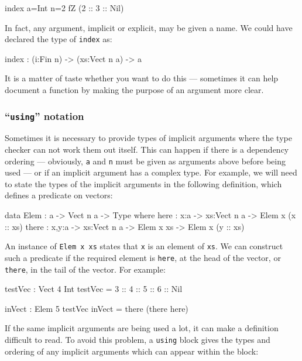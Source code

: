 \begin{code}
index {a=Int} {n=2} fZ (2 :: 3 :: Nil)
\end{code}

\noindent
In fact, any argument, implicit or explicit, may be given a name.
We could have declared the type of \texttt{index} as:

\begin{code}
index : (i:Fin n) -> (xs:Vect n a) -> a
\end{code}

\noindent
It is a matter of taste whether you want to do this --- sometimes it can help document a function by making the purpose of an argument more clear.

\subsubsection{``\texttt{using}'' notation}

Sometimes it is necessary to provide types of implicit arguments where the type checker can not work them out itself.
This can happen if there is a dependency ordering --- obviously, \texttt{a} and \texttt{n} must be given as arguments above before being used --- or if an implicit argument has a complex type.
For example, we will need to state the types of the implicit arguments in the following definition, which defines a predicate on vectors:

\begin{code}
data Elem : a -> Vect n a -> Type where
   here :  {x:a} ->   {xs:Vect n a} -> Elem x (x :: xs)
   there : {x,y:a} -> {xs:Vect n a} -> Elem x xs -> Elem x (y :: xs)
\end{code}

\noindent
An instance of \texttt{Elem x xs} states that \texttt{x} is an element of 
\texttt{xs}.
We can construct such a predicate if the required element is \texttt{here}, at the head of the vector, or \texttt{there}, in the tail of the vector.
For example:

\begin{code}
testVec : Vect 4 Int
testVec = 3 :: 4 :: 5 :: 6 :: Nil

inVect : Elem 5 testVec
inVect = there (there here)
\end{code}

\noindent
If the same implicit arguments are being used a lot, it can make a definition difficult to read.
To avoid this problem, a \texttt{using} block gives the types and ordering of any implicit arguments which can appear within the block:

